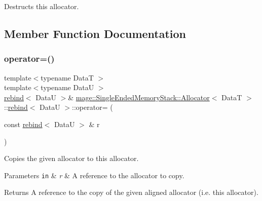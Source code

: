 Destructs this allocator. 

\subsection{Member Function Documentation}
\hypertarget{structmage_1_1_single_ended_memory_stack_1_1_allocator_1_1rebind_a4d720811d1c58d5b5eb0d7316f8c5f3a}{}\label{structmage_1_1_single_ended_memory_stack_1_1_allocator_1_1rebind_a4d720811d1c58d5b5eb0d7316f8c5f3a} 
\subsubsection{\texorpdfstring{operator=()}{operator=()}\hspace{0.1cm}{\footnotesize\ttfamily [1/2]}}
{\footnotesize\ttfamily template$<$typename DataT $>$ \\
template$<$typename DataU $>$ \\
\hyperlink{structmage_1_1_single_ended_memory_stack_1_1_allocator_1_1rebind}{rebind}$<$ DataU $>$\& \hyperlink{structmage_1_1_single_ended_memory_stack_1_1_allocator}{mage\+::\+Single\+Ended\+Memory\+Stack\+::\+Allocator}$<$ DataT $>$\+::\hyperlink{structmage_1_1_single_ended_memory_stack_1_1_allocator_1_1rebind}{rebind}$<$ DataU $>$\+::operator= (\begin{DoxyParamCaption}\item[{const \hyperlink{structmage_1_1_single_ended_memory_stack_1_1_allocator_1_1rebind}{rebind}$<$ DataU $>$ \&}]{r }\end{DoxyParamCaption})\hspace{0.3cm}{\ttfamily [delete]}}

Copies the given allocator to this allocator.


\begin{DoxyParams}[1]{Parameters}
\mbox{\tt in}  & {\em r} & A reference to the allocator to copy. \\
\hline
\end{DoxyParams}
\begin{DoxyReturn}{Returns}
A reference to the copy of the given aligned allocator (i.\+e. this allocator). 
\end{DoxyReturn}
\hypertarget{structmage_1_1_single_ended_memory_stack_1_1_allocator_1_1rebind_a429bbc7cc8ebca81225731385729f2ff}{}\label{structmage_1_1_single_ended_memory_stack_1_1_allocator_1_1rebind_a429bbc7cc8ebca81225731385729f2ff} 
